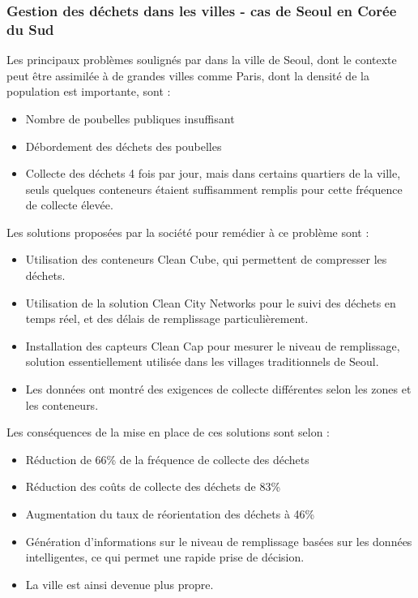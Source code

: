 \documentclass[a4paper,12pt]{report}
\begin{document}
\subsubsection*{Gestion des déchets dans les villes - cas de Seoul en Corée du Sud}
Les principaux problèmes soulignés par \cite{ref8} dans la ville de Seoul, dont le contexte peut être assimilée à de grandes villes comme Paris, dont la densité de la population est importante, sont :
\begin{itemize}
\item Nombre de poubelles publiques insuffisant
\item Débordement des déchets des poubelles 
\item Collecte des déchets 4 fois par jour, mais dans certains quartiers de la ville, seuls quelques conteneurs étaient suffisamment remplis pour cette fréquence de collecte élevée. 
\end{itemize}
Les solutions proposées par la société pour remédier à ce problème sont :
\begin{itemize}
\item Utilisation des conteneurs Clean Cube, qui permettent de compresser les déchets.
\item Utilisation de la solution Clean City Networks pour le suivi des déchets en temps réel, et des délais de remplissage particulièrement.
\item Installation des capteurs Clean Cap pour mesurer le niveau de remplissage, solution essentiellement utilisée dans les villages traditionnels de Seoul. 
\item Les données ont montré des exigences de collecte différentes selon les zones et les conteneurs.
\end{itemize} 
Les conséquences de la mise en place de ces solutions sont selon \cite{ref8} :
\begin{itemize}
\item Réduction de 66\% de la fréquence de collecte des déchets
\item Réduction des coûts de collecte des déchets de 83\%
\item Augmentation du taux de réorientation des déchets à 46\%
\item Génération d'informations sur le niveau de remplissage basées sur les données intelligentes, ce qui permet une rapide prise de décision.
\item La ville est ainsi devenue plus propre.
\end{itemize}
\end{document}
